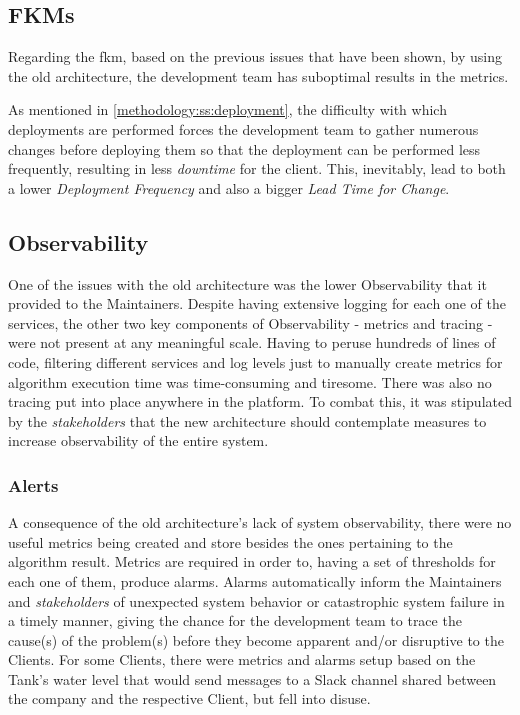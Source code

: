 \subsection{FKMs}\label{methodology:sss:fkms}

Regarding the \gls{fkm}, based on the previous issues that have been shown, by using the old architecture, the development team has suboptimal results in the metrics.

As mentioned in \cref{methodology:ss:deployment}, the difficulty with which deployments are performed forces the development team to gather numerous changes before deploying them so that the deployment can be performed less frequently, resulting in less \textit{downtime} for the client. This, inevitably, lead to both a lower \textit{Deployment Frequency} and also a bigger \textit{Lead Time for Change}.



\subsection{Observability}\label{methodology:ss:observability}

One of the issues with the old architecture was the lower Observability that it provided to the Maintainers. Despite having extensive logging for each one of the services, the other two key components of Observability - metrics and tracing - were not present at any meaningful scale. Having to peruse hundreds of lines of code, filtering different services and log levels just to manually create metrics for algorithm execution time was time-consuming and tiresome. There was also no tracing put into place anywhere in the platform. To combat this, it was stipulated by the \textit{stakeholders} that the new architecture should contemplate measures to increase observability of the entire system.

\subsubsection{Alerts}\label{methodology:sss:alerts}
A consequence of the old architecture's lack of system observability, there were no useful metrics being created and store besides the ones pertaining to the algorithm result. Metrics are required in order to, having a set of thresholds for each one of them, produce alarms. Alarms automatically inform the Maintainers and \textit{stakeholders} of unexpected system behavior or catastrophic system failure in a timely manner, giving the chance for the development team to trace the cause(s) of the problem(s) before they become apparent and/or disruptive to the Clients. For some Clients, there were metrics and alarms setup based on the Tank's water level that would send messages to a Slack channel shared between the company and the respective Client, but fell into disuse.



